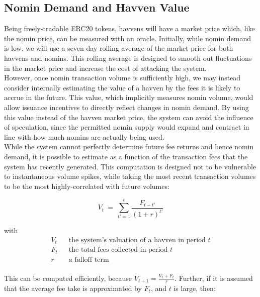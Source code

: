 \newpage

\subsection{Nomin Demand and Havven Value}

\noindent Being freely-tradable ERC20 tokens, havvens will have a market
price which, like the nomin price, can be measured with an oracle. Initially,
while nomin demand is low, we will use a seven day rolling average of the
market price for both havvens and nomins. This rolling average is designed to
smooth out fluctuations in the market price and increase the cost of
attacking the system.\\

\noindent However, once nomin transaction volume is sufficiently high, we may
instead consider internally estimating the value of a havven by the fees it
is likely to accrue in the future. This value, which implicitly measures
nomin volume, would allow issuance incentives to directly reflect changes in
nomin demand. By using this value instead of the havven market price, the
system can avoid the influence of speculation, since the permitted nomin
supply would expand and contract in line with how much nomins are actually
being used. \\

\noindent While the system cannot perfectly determine future fee returns and
hence nomin demand, it is possible to estimate as a function of the
transaction fees that the system has recently generated. This computation is
designed not to be vulnerable to instantaneous volume spikes, while taking
the most recent transaction volumes to be the most highly-correlated with
future volumes:
\vspace{3mm}

\begin{equation}
    V_{t} \ = \ \sum_{t'=1}^{t} \frac{F_{t - t'}}{(1 + r)^{t'}} \label{eq:price}
\end{equation}

with
\begin{align*} 
V_{t} \ \ & \text{ the system's valuation of a havven in period } t  \\
F_t \ \ & \text{ the total fees collected in period } t\\
r \ \ & \text{ a falloff term}  \\
\end{align*}

\noindent This can be computed efficiently, because $V_{t+1} = \frac{V_t + F_t}{r}$. 
Further, if it is assumed that the average fee take is approximated by $F_t$, and $t$ is large, then:

